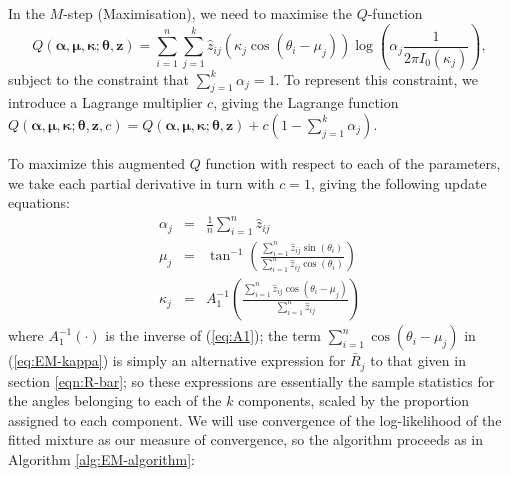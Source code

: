 \documentclass[../../ArchStats.tex]{subfiles}
\begin{document}
In the $M$-step (Maximisation), we need to maximise the $Q$-function
\begin{equation}
Q(\boldsymbol{\alpha, \mu, \kappa}; \boldsymbol{\theta, z}) = \sum_{i=1}^n \sum_{j=1}
^k \hat{z}_{ij} \left(\kappa_j \cos(\theta_i - \mu_j)  \right) \log \left( \alpha_j  \frac{1}{2\pi I_0(\kappa_j)} \right),
\end{equation}
subject to the constraint that $\sum_{j=1}^k \alpha_j = 1$. To represent this constraint, we introduce a Lagrange multiplier $c$, giving the Lagrange function $Q(\boldsymbol{\alpha, \mu, \kappa}; \boldsymbol{\theta, z}, c) = Q(\boldsymbol{\alpha, \mu, \kappa}; \boldsymbol{\theta, z}) + c \left(1 - \sum_{j=1}^k \alpha_j \right)$. 

To maximize this augmented $Q$ function with respect to each of the parameters, we take each partial derivative in turn with $c=1$, giving the following update equations:
\begin{eqnarray}
\label{eq:EM-alpha}
\alpha_j &=& \frac{1}{n} \sum_{i=1}^n \hat{z}_{ij} \\[5pt]
\label{eq:EM-mu}
\mu_j &=& \tan^{-1} \left( \frac{\sum_{i=1}^n \hat{z}_{ij} \sin(\theta_i)}{\sum_{i=1}^n \hat{z}_{ij} \cos(\theta_i)} \right) \\[5pt]
\label{eq:EM-kappa}
\kappa_j &=& A_1^{-1} \left(\frac{\sum_{i=1}^n \hat{z}_{ij} \cos(\theta_i - \mu_j)}{\sum_{i=1}^n \hat{z}_{ij}}\right)
\end{eqnarray}
where $A_1^{-1}(\cdot)$ is the inverse of (\ref{eq:A1}); the term $\sum_{i=1}^n \cos(\theta_i - \mu_j)$ in (\ref{eq:EM-kappa}) is simply an alternative expression for $\bar{R}_j$ to that given in section \ref{eqn:R-bar}; so these expressions are essentially the sample statistics for the angles belonging to each of the $k$ components, scaled by the proportion assigned to each component. We will use convergence of the log-likelihood of the fitted mixture as our measure of convergence, so the algorithm proceeds as in Algorithm \ref{alg:EM-algorithm}:
\end{document}
